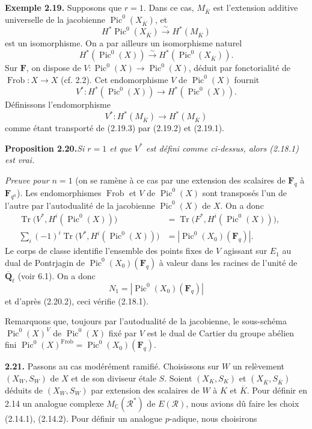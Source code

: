 \documentclass[11pt]{article}
\newcommand{\Fq}{\mathbf{F}_q}
\newcommand{\Fqn}{\mathbf{F}_{q^n}}
\newcommand{\F}{\mathbf{F}}
\newcommand{\Qbl}{\overline{\mathbf{Q}}_{\ell}}
\newcommand{\Frob}{\operatorname{Frob}}
\newcommand{\Pic}{\operatorname{Pic}}
\newcommand{\Tr}{\operatorname{Tr}}
\newcommand{\C}{\mathbb{C}}
\newcommand{\Rcal}{\mathcal{R}}
\newcommand{\para}[1]{\medskip\noindent\textbf{#1}\enspace}
\begin{document}
\para{Exemple 2.19.} Supposons que \(r=1\). Dans ce cas, \(M_{\overline K}\) est l'extension additive universelle de la jacobienne \(\Pic^0(X_{\overline K})\), et
\begin{equation}
H^*\Pic^0(X_{\overline K})\xrightarrow{\sim} H^*(M_{\overline K})
\tag{2.19.1}
\end{equation}
est un isomorphisme. On a par ailleurs un isomorphisme naturel
\begin{equation}
H^*(\Pic^0(X))\xrightarrow{\sim} H^*(\Pic^0(X_{\overline K})).
\tag{2.19.2}
\end{equation}
Sur \(\F\), on dispose de \(V:\Pic^0(X)\to\Pic^0(X)\), déduit par fonctorialité de \(\Frob:X\to X\) (cf. 2.2). Cet endomorphisme \(V\) de \(\Pic^0(X)\) fournit
\begin{equation}
V^*:H^*(\Pic^0(X))\to H^*(\Pic^0(X)).
\tag{2.19.3}
\end{equation}
Définissons l'endomorphisme
\begin{equation}
V^*:H^*(M_{\overline K})\to H^*(M_{\overline K})
\tag{2.19.4}
\end{equation}
comme étant transporté de (2.19.3) par (2.19.2) et (2.19.1).

\noindent\textbf{Proposition 2.20.}\quad\textit{Si \(r=1\) et que \(V^*\) est défini comme ci-dessus, alors (2.18.1) est vrai.}

\noindent\textit{Preuve pour \(n=1\)} (on se ramène à ce cas par une extension des scalaires de \(\Fq\) à \(\Fqn\)). Les endomorphismes \(\Frob\) et \(V\) de \(\Pic^0(X)\) sont transposés l'un de l'autre par l'autodualité de la jacobienne \(\Pic^0(X)\) de \(X\). On a donc
\begin{align}
\Tr\bigl(V^*,H^i(\Pic^0(X))\bigr)&=\Tr\bigl(F^*,H^i(\Pic^0(X))\bigr), &&\tag{2.20.1}\\
\sum_i(-1)^i\Tr\bigl(V^*,H^i(\Pic^0(X))\bigr)&=|\Pic^0(X_0)(\Fq)|. &&\tag{2.20.2}
\end{align}
Le corps de classe identifie l'ensemble des points fixes de \(V\) agissant sur \(E_1\) au dual de Pontrjagin de \(\Pic^0(X_0)(\Fq)\) à valeur dans les racines de l'unité de \(\Qbl\) (voir 6.1). On a donc
\[
N_1=|\Pic^0(X_0)(\Fq)|
\]
et d'après (2.20.2), ceci vérifie (2.18.1).

Remarquons que, toujours par l'autodualité de la jacobienne, le sous-schéma \(\Pic^0(X)^V\) de \(\Pic^0(X)\) fixé par \(V\) est le dual de Cartier du groupe abélien fini \(\Pic^0(X)^{\Frob}=\Pic^0(X_0)(\Fq)\).

\para{2.21.} Passons au cas modérément ramifié. Choisissons sur \(W\) un relèvement \((X_W,S_W)\) de \(X\) et de son diviseur étale \(S\). Soient \((X_K,S_K)\) et \((X_{\overline K},S_{\overline K})\) déduits de \((X_W,S_W)\) par extension des scalaires de \(W\) à \(K\) et \(\overline K\). Pour définir en 2.14 un analogue complexe \(M_\C(\Rcal^*)\) de \(E(\Rcal)\), nous avions dû faire les choix (2.14.1), (2.14.2). Pour définir un analogue \(p\)-adique, nous choisirons
\end{document}

